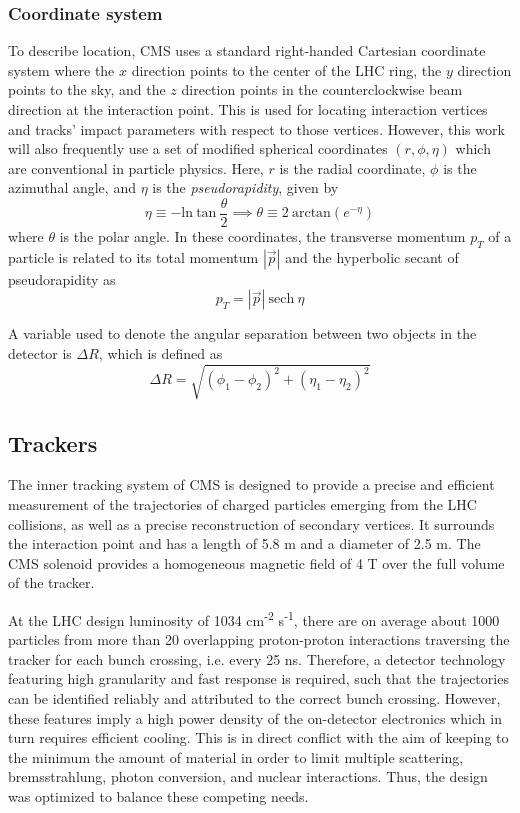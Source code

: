 \subsubsection{Coordinate system}
To describe location, CMS uses a standard right-handed Cartesian coordinate system where 
the $x$ direction points to the center of the LHC ring, 
the $y$ direction points to the sky,
and the $z$ direction points in the counterclockwise beam direction at the interaction point.
This is used for locating interaction vertices and tracks' impact parameters with respect to those vertices.
However, this work will also frequently use a set of modified spherical coordinates $(r,\phi,\eta)$
which are conventional in particle physics.
Here, $r$ is the radial coordinate, $\phi$ is the azimuthal angle, and $\eta$ is the \textit{pseudorapidity}, given by
\begin{equation}
\eta  \equiv {-} \mathrm{ln}\:\mathrm{tan}\:\frac{\theta}{2} \implies \theta \equiv 2\:\mathrm{arctan} \left(e^{-\eta}\right)
\label{eq:eta}
\end{equation}
where $\theta$ is the polar angle. 
In these coordinates, the transverse momentum $p_T$ of a particle is related to its total momentum $|\vec{p}|$ and the hyperbolic secant of pseudorapidity as
\begin{equation}
p_T = |\vec{p}|~\mathrm{sech}~\eta
\end{equation}

A variable used to denote the angular separation between two objects in the detector is $\Delta R$,
which is defined as
\begin{equation}
\Delta R = \sqrt{(\phi_1-\phi_2)^2 + (\eta_1-\eta_2)^2}
\end{equation}

\subsection{Trackers}

The inner tracking system of CMS is designed to provide a precise and efficient measurement
of the trajectories of charged particles emerging from the LHC collisions, as well as a precise
reconstruction of secondary vertices. It surrounds the interaction point and has a length of 5.8 m
and a diameter of 2.5 m. The CMS solenoid provides a homogeneous magnetic field of 4 T over
the full volume of the tracker.

At the LHC design luminosity of 1034 cm\textsuperscript{-2} s\textsuperscript{-1},
there are on average about 1000 particles from more than 20 overlapping proton-proton interactions traversing
the tracker for each bunch crossing, i.e. every 25 ns. Therefore, a detector technology featuring high
granularity and fast response is required, such that the trajectories can be identified reliably and
attributed to the correct bunch crossing. However, these features imply a high power density of
the on-detector electronics which in turn requires efficient cooling. This is in direct conflict with
the aim of keeping to the minimum the amount of material in order to limit multiple scattering,
bremsstrahlung, photon conversion, and nuclear interactions. Thus, the design was optimized to balance these competing needs.


